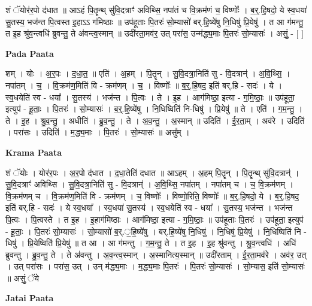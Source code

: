 \documentclass[17pt]{extarticle}
\begin{document}
शं ॅयोर॑र॒पो द॑धात ॥ आऽहं पि॒तॄन्थ् सु॑वि॒दत्राꣳ॑ अविथ्सि॒ नपा॑तं च वि॒क्रम॑णं च॒ विष्णोः᳚ । ब॒र्॒.हि॒षदो॒ ये स्व॒धया॑ सु॒तस्य॒ भज॑न्त पि॒त्वस्त इ॒हाऽऽ ग॑मिष्ठाः ॥ उप॑हूताः पि॒तरः॑ सो॒म्यासो॑ बर्.हि॒ष्ये॑षु नि॒धिषु॑ प्रि॒येषु॑ । त आ ग॑मन्तु॒ त इ॒ह श्रु॑व॒न्त्वधि॑ ब्रुवन्तु॒ ते अ॑वन्त्व॒स्मान् ॥ उदी॑रता॒मव॑र॒ उत् परा॑स॒ उन्म॑द्ध्य॒माः पि॒तरः॑ सो॒म्यासः॑ । असुं॒ - [  ] \newline

\textbf{Pada Paata} \newline

शम् । योः । अ॒र॒पः । द॒धा॒त॒ ॥ एति॑ । अ॒हम् । पि॒तॄन् । सु॒वि॒दत्रा॒निति॑ सु - वि॒दत्रान्॑ । अ॒वि॒थ्सि॒ । नपा॑तम् । च॒ । वि॒क्रम॑ण॒मिति॑ वि - क्रम॑णम् । च॒ । विष्णोः᳚ ॥ ब॒र्॒.हि॒षद॒ इति॑ बर्.हि - सदः॑ । ये । स्व॒धयेति॑ स्व - धया᳚ । सु॒तस्य॑ । भज॑न्त । पि॒त्वः । ते । इ॒ह । आग॑मिष्ठा॒ इत्या - ग॒मि॒ष्ठाः॒ ॥ उप॑हूता॒ इत्युप॑ - हू॒ताः॒ । पि॒तरः॑ । सो॒म्यासः॑ । ब॒र्॒.हि॒ष्ये॑षु । नि॒धिष्विति॑ नि-धिषु॑ । प्रि॒येषु॑ ॥ ते । एति॑ । ग॒म॒न्तु॒ । ते । इ॒ह । श्रु॒व॒न्तु॒ । अधीति॑ । ब्रु॒व॒न्तु॒ । ते । अ॒व॒न्तु॒ । अ॒स्मान् ॥ उदिति॑ । ई॒र॒ता॒म् । अव॑रे । उदिति॑ । परा॑सः । उदिति॑ । म॒द्ध्य॒माः । पि॒तरः॑ । सो॒म्यासः॑ ॥ असु᳚म् ।  \newline


\textbf{Krama Paata} \newline

शं ॅयोः । योर॑र॒पः । अ॒र॒पो द॑धात । द॒धा॒तेति॑ दधात ॥ आऽहम् । अ॒हम् पि॒तॄन् । पि॒तॄन्थ् सु॑वि॒दत्रान्॑ । सु॒वि॒दत्राꣳ॑ अविथ्सि । सु॒वि॒दत्रा॒निति॑ सु - वि॒दत्रान्॑ । अ॒वि॒थ्सि॒ नपा॑तम् । नपा॑तम् च । च॒ वि॒क्रम॑णम् । वि॒क्रम॑णम् च । वि॒क्रम॑ण॒मिति॑ वि - क्रम॑णम् । च॒ विष्णोः᳚ । विष्णो॒रिति॒ विष्णोः᳚ ॥ ब॒र्॒.हि॒षदो॒ ये । ब॒र्॒.हि॒षद॒ इति॑ बर्.हि - सदः॑ । ये स्व॒धया᳚ । स्व॒धया॑ सु॒तस्य॑ । स्व॒धयेति॑ स्व - धया᳚ । सु॒तस्य॒ भज॑न्त । भज॑न्त पि॒त्वः । पि॒त्वस्ते । त इ॒ह । इ॒हाग॑मिष्ठाः । आग॑मिष्ठा॒ इत्या - ग॒मि॒ष्ठाः॒ ॥ उप॑हूताः पि॒तरः॑ । उप॑हूता॒ इत्युप॑ - हू॒ताः॒ । पि॒तरः॑ सो॒म्यासः॑ । सो॒म्यासो॑ ब॒र्.॒हि॒ष्ये॑षु । बर्.हि॒ष्ये॑षु नि॒धिषु॑ । नि॒धिषु॑ प्रि॒येषु॑ । नि॒धिष्विति॑ नि - धिषु॑ । प्रि॒येष्विति॑ प्रि॒येषु॑ ॥ त आ । आ ग॑मन्तु । ग॒म॒न्तु॒ ते । त इ॒ह । इ॒ह श्रु॑वन्तु । श्रु॒व॒न्त्वधि॑ । अधि॑ ब्रुवन्तु । ब्रु॒व॒न्तु॒ ते । ते अ॑वन्तु । अ॒व॒न्त्व॒स्मान् । अ॒स्मानित्य॒स्मान् ॥ उदी॑रताम् । ई॒र॒ता॒मव॑रे । अव॑र॒ उत् । उत् परा॑सः । परा॑स॒ उत् । उन् म॑द्ध्य॒माः । म॒द्ध्य॒माः पि॒तरः॑ । पि॒तरः॑ सो॒म्यासः॑ । सो॒म्यास॒ इति॑ सो॒म्यासः॑ ॥ असुं॒ ॅये \newline

\textbf{Jatai Paata} \newline
\end{document}
